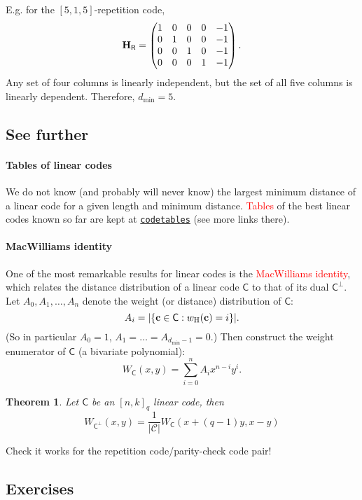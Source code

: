 \documentclass[a4paper, 11pt, openany]{book}
\numberwithin{equation}{section}
\theoremstyle{plain}
\newtheorem{theorem}	[equation]	{Theorem}
\theoremstyle{definition}
\newcommand{\dmin}{d_{\min}}
\newcommand{\wH}{w_\mathrm{H}}
\newcommand{\Important}[1]{\textcolor{red}{#1}}
\newcommand{\code}[1]{\mathsf{#1}}
\newcommand{\Repetition}            {\code{R}}
\begin{document}
E.g. for the $[5,1,5]$-repetition code,
\[
	{\bf H}_{\Repetition} = \begin{pmatrix}
	1 & 0 & 0 & 0 & -1\\
	0 & 1 & 0 & 0 & -1\\
	0 & 0 & 1 & 0 & -1\\
	0 & 0 & 0 & 1 & -1
	\end{pmatrix}.
\]
Any set of four columns is linearly independent, but the set of all five columns is linearly dependent. Therefore, $\dmin = 5$.






\subsection{See further}

\paragraph{Tables of linear codes}
We do not know (and probably will never know) the largest minimum distance of a linear code for a given length and minimum distance. \Important{Tables} of the best linear codes known so far are kept at \href{http://www.codetables.de/}{\texttt{codetables}}  (see more links there).

\paragraph{MacWilliams identity}
One of the most remarkable results for linear codes is the \Important{MacWilliams identity}, which relates the distance distribution of a linear code $\code{C}$ to that of its dual $\code{C}^\perp$. Let $A_0, A_1, \dots, A_n$ denote the weight (or distance) distribution of $\code{C}$:
\[
    A_i = |\{ {\bf c} \in \code{C} : \wH({\bf c}) = i \}|.
\]
(So in particular $A_0 = 1$, $A_1 = \dots = A_{\dmin  - 1} = 0$.) Then construct the weight enumerator of $\code{C}$ (a bivariate polynomial):
\[
    W_\code{C}(x,y) = \sum_{i=0}^n A_i x^{n-i} y^i.
\]

\begin{theorem}
Let $\code{C}$ be an $[n,k]_q$ linear code, then
\[
     W_{\code{C}^\perp} (x,y) = \frac{1}{|\mathcal{C}|} W_\code{C}(x + (q-1)y, x - y)
\]
\end{theorem}

Check it works for the repetition code/parity-check code pair!

\subsection{Exercises}
\end{document}
